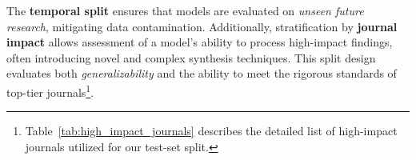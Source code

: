 The \textbf{temporal split} ensures that models are evaluated on \textit{unseen future research}, mitigating data contamination. Additionally, stratification by \textbf{journal impact} allows assessment of a model’s ability to process high-impact findings, often introducing novel and complex synthesis techniques. This split design evaluates both \textit{generalizability} and the ability to meet the rigorous standards of top-tier journals\footnote{Table~\ref{tab:high_impact_journals} describes the detailed list of high-impact journals utilized for our test-set split.}.





